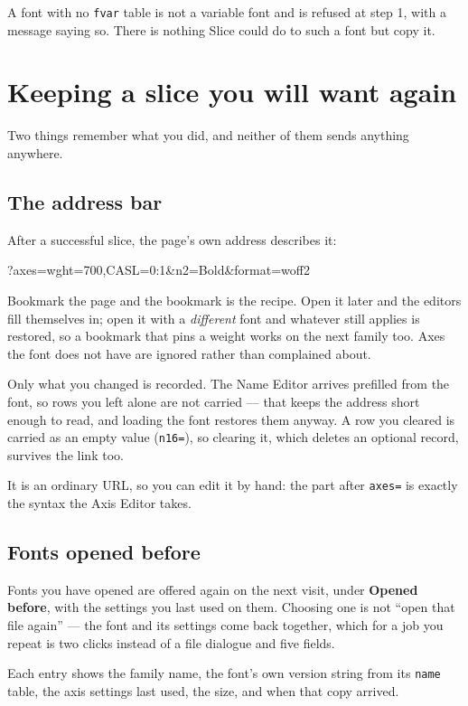 \documentclass[11pt,a4paper]{article}
\begin{document}
A font with no \texttt{fvar} table is not a variable font and is refused at step 1, with a message saying so. There is nothing Slice could do to such a font but copy it.

\section{Keeping a slice you will want again}

Two things remember what you did, and neither of them sends anything anywhere.

\subsection{The address bar}

After a successful slice, the page's own address describes it:

\begin{code}
?axes=wght=700,CASL=0:1&n2=Bold&format=woff2
\end{code}

Bookmark the page and the bookmark is the recipe. Open it later and the editors fill themselves in; open it with a \emph{different} font and whatever still applies is restored, so a bookmark that pins a weight works on the next family too. Axes the font does not have are ignored rather than complained about.

Only what you changed is recorded. The Name Editor arrives prefilled from the font, so rows you left alone are not carried --- that keeps the address short enough to read, and loading the font restores them anyway. A row you cleared is carried as an empty value (\texttt{n16=}), so clearing it, which deletes an optional record, survives the link too.

It is an ordinary URL, so you can edit it by hand: the part after \texttt{axes=} is exactly the syntax the Axis Editor takes.

\subsection{Fonts opened before}

Fonts you have opened are offered again on the next visit, under \textbf{Opened before}, with the settings you last used on them. Choosing one is not ``open that file again'' --- the font and its settings come back together, which for a job you repeat is two clicks instead of a file dialogue and five fields.

Each entry shows the family name, the font's own version string from its \texttt{name} table, the axis settings last used, the size, and when that copy arrived.
\end{document}
